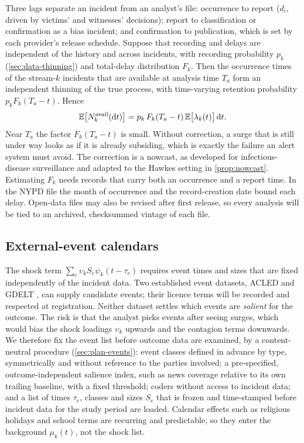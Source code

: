 Three lags separate an incident from an analyst's file: occurrence to report
($d_i$, driven by victims' and witnesses' decisions); report to
classification or confirmation as a bias incident; and confirmation to
publication, which is set by each provider's release schedule. Suppose that
recording and delays are independent of the history and across incidents,
with recording probability $p_k$ (\cref{sec:data-thinning}) and total-delay distribution
$F_k$. Then the occurrence times of the stream-$k$ incidents that are
available at analysis time $T_a$ form an independent thinning of the true
process, with time-varying retention probability $p_k F_k(T_a - t)$. Hence
\begin{equation}\label{eq:data-righttrunc}
  \mathbb{E}\bigl[N_k^{\mathrm{avail}}(\mathrm{d} t)\bigr]
  = p_k\,F_k(T_a - t)\,\mathbb{E}\bigl[\lambda_k(t)\bigr]\,\mathrm{d} t .
\end{equation}
Near $T_a$ the factor $F_k(T_a - t)$ is small. Without correction, a surge
that is still under way looks as if it is already subsiding, which is
exactly the failure an alert system must avoid. The correction is a
nowcast, as developed for infectious-disease surveillance
\citep{hohle2014,mcgough2020} and adapted to the Hawkes setting in
\cref{prop:nowcast}. Estimating $F_k$ needs records that carry both an
occurrence and a report time. In the NYPD file the month of occurrence and
the record-creation date bound each delay. Open-data files may also be revised after
first release, so every analysis will be tied to an archived, checksummed
vintage of each file.

\subsection{External-event calendars}\label{sec:data-events}

The shock term $\sum_e \upsilon_k S_e \psi_k(t - \tau_e)$ requires event times
and sizes that are fixed independently of the incident data. Two established
event datasets, ACLED \citep{raleigh2010} and GDELT \citep{leetaru2013}, can supply
candidate events; their licence terms will be recorded and respected at registration.
Neither dataset settles which events are \emph{salient} for the outcome. The risk is that
the analyst picks events after seeing surges, which would bias the shock loadings
$\upsilon_k$ upwards and the contagion terms downwards. We therefore fix the event list
before outcome data are examined, by a content-neutral procedure
(\cref{sec:plan-events}): event classes defined in advance by type, symmetrically and
without reference to the parties involved; a pre-specified, outcome-independent salience
index, such as news coverage relative to its own trailing baseline, with a fixed
threshold; coders without access to incident data; and a list of times $\tau_e$, classes
and sizes $S_e$ that is frozen and time-stamped before incident data for the study period
are loaded. Calendar effects such as religious holidays and school terms are recurring
and predictable, so they enter the background $\mu_k(t)$, not the shock
list.

